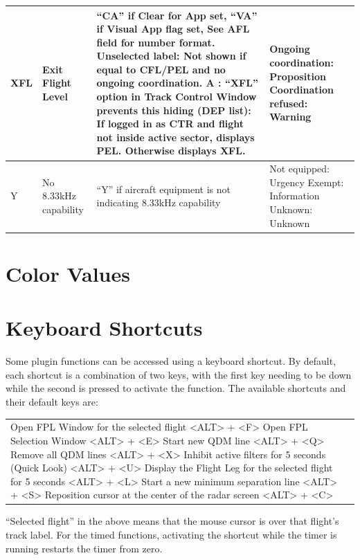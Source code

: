 \documentclass[11pt,a4paper,oldfontcommands]{memoir}
\begin{document}
\begin{landscape}
\begin{longtable}{|p{3cm}|p{4cm}|p{8cm}|p{6cm}|}
    XFL &
      Exit Flight Level &
      “CA” if Clear for App set, “VA” if Visual App flag set, See AFL field for number format. Unselected label: Not shown if equal to CFL/PEL and  no ongoing coordination. A : “XFL” option in Track Control   Window prevents this hiding (DEP list): If logged in as CTR and flight not  inside active sector, displays PEL.  Otherwise displays XFL. &
      Ongoing coordination:  Proposition Coordination refused: Warning \\ \hline
    Y &
      No 8.33kHz capability &
      “Y” if aircraft equipment is not  indicating 8.33kHz capability &
      Not equipped: Urgency Exempt: Information Unknown: Unknown \\ \hline
    \end{longtable}
\end{landscape}
\chapter{Color Values}



\chapter{Keyboard Shortcuts}

Some plugin functions can be accessed using a keyboard shortcut. By default, each shortcut is a combination of two keys, with the first key needing to be down while the second is pressed to activate the function. The available shortcuts and their default keys are:

\begin{tabular}{l l}
    Open FPL Window for the selected flight                         <ALT> + <F>
    Open FPL Selection Window                                       <ALT> + <E>
    Start new QDM line                                              <ALT> + <Q>
    Remove all QDM lines                                            <ALT> + <X>
    Inhibit active filters for 5 seconds (Quick Look)               <ALT> + <U>
    Display the Flight Leg for the selected flight for 5 seconds    <ALT> + <L>
    Start a new minimum separation line                             <ALT> + <S>
    Reposition cursor at the center of the radar screen             <ALT> + <C>    
\end{tabular}

“Selected flight” in the above means that the mouse cursor is over that flight’s track label. For the timed functions, activating the shortcut while the timer is running restarts the timer from zero.




\end{document}
